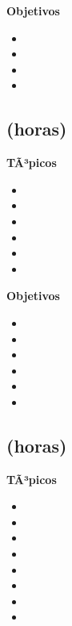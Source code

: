 \textbf{Objetivos}
\begin{itemize}
	\item \ARUNOObjUNO
	\item \ARUNOObjDOS
	\item \ARUNOObjTRES
	\item \ARUNOObjCUATRO
\end{itemize}

\subsection{\ARDOSDef  (\ARDOSHours horas)}\label{sec:BOK-AR2}

\textbf{TÃ³picos}
\begin{itemize}
	\item \ARDOSTopicBits
	\item \ARDOSTopicRepresentacion
	\item \ARDOSTopicSistemas
	\item \ARDOSTopicRepresentacionde
	\item \ARDOSTopicRepresentaciondedatos
	\item \ARDOSTopicRepresentacionderegistros
\end{itemize}

\textbf{Objetivos}
\begin{itemize}
	\item \ARDOSObjUNO
	\item \ARDOSObjDOS
	\item \ARDOSObjTRES
	\item \ARDOSObjCUATRO
	\item \ARDOSObjCINCO
	\item \ARDOSObjSEIS
\end{itemize}

\subsection{\ARTRESDef  (\ARTRESHours horas)}\label{sec:BOK-AR3}

\textbf{TÃ³picos}
\begin{itemize}
	\item \ARTRESTopicOrganizacion
	\item \ARTRESTopicUnidad
	\item \ARTRESTopicConjuntos
	\item \ARTRESTopicLenguaje
	\item \ARTRESTopicFormatos
	\item \ARTRESTopicModos
	\item \ARTRESTopicLlamada
	\item \ARTRESTopicEntradas
\end{itemize}

